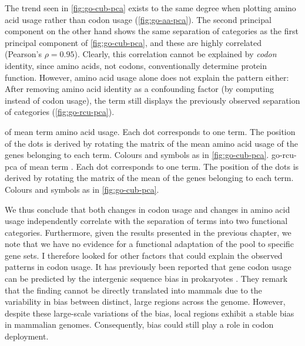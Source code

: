 The trend seen in \cref{fig:go-cub-pca} exists to the same degree when plotting
amino acid usage rather than codon usage (\cref{fig:go-aa-pca}).
The second principal component on the other hand shows the same separation of
\go categories as the first principal component of \cref{fig:go-cub-pca}, and
these are highly correlated (Pearson’s \(\rho = 0.95\)). Clearly, this
correlation cannot be explained by \emph{codon} identity, since amino acids, not
codons, conventionally determine protein function. However, amino acid usage
alone does not explain the pattern either: After removing amino acid identity as
a confounding factor (by computing \rcu instead of codon usage), the \go term
\pca still displays the previously observed separation of \go categories
(\cref{fig:go-rcu-pca}).

    {\pca of mean \go term amino acid usage.}
    {Each dot corresponds to one \go term. The position of the dots is derived
    by rotating the matrix of the mean amino acid usage of the genes belonging
    to each \go term. Colours and symbols as in \cref{fig:go-cub-pca}.}
    {go-rcu-pca}
    {\pca of mean \go term \rcu.}
    {Each dot corresponds to one \go term. The position of the dots is derived
    by rotating the matrix of the mean \rcu of the genes belonging to each \go
    term. Colours and symbols as in \cref{fig:go-cub-pca}.}

We thus conclude that both changes in codon usage and changes in amino acid
usage independently correlate with the separation of \go terms into two
functional categories. Furthermore, given the results presented in the previous
chapter, we note that we have no evidence for a functional adaptation of the
\trna pool to specific gene sets. I therefore looked for other factors that
could explain the observed patterns in codon usage. It has previously been
reported that gene codon usage can be predicted by the intergenic sequence \gc
bias in prokaryotes \citep{Chen:2004}. They remark that the finding cannot be
directly translated into mammals due to the variability in \gc bias between
distinct, large regions across the genome. However, despite these large-scale
variations of the \gc bias, local regions exhibit a stable \gc bias in mammalian
genomes. Consequently, \gc bias could still play a role in codon deployment.

